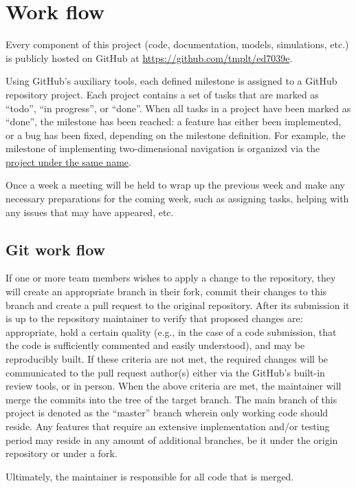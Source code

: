 \section{Work flow}
Every component of this project (code, documentation, models, simulations, etc.) is publicly hosted on GitHub at \href{https://github.com/tmplt/ed7039e}{https://github.com/tmplt/ed7039e}.

Using GitHub's auxiliary tools, each defined milestone is assigned to a GitHub repository project.
Each project contains a set of tasks that are marked as ``todo'', ``in progress'', or ``done''.
When all tasks in a project have been marked as ``done'', the milestone has been reached:
a feature has either been implemented, or a bug has been fixed, depending on the milestone definition.
For example, the milestone of implementing two-dimensional navigation is organized via the \href{https://github.com/tmplt/ed7039e/projects/1}{project under the same name}.

Once a week a meeting will be held to wrap up the previous week and make any necessary preparations for the coming week,
such as assigning tasks, helping with any issues that may have appeared, etc.

\subsection{Git work flow}
If one or more team members wishes to apply a change to the repository,
they will create an appropriate branch in their fork,
commit their changes to this branch and create a pull request to the original repository.
After its submission it is up to the repository maintainer to verify that proposed changes are:
appropriate,
hold a certain quality (e.g., in the case of a code submission, that the code is sufficiently commented and easily understood),
and may be reproducibly built. %
If these criteria are not met, the required changes will be communicated to the pull request author(s) either via the GitHub's built-in review tools, or in person.
When the above criteria are met, the maintainer will merge the commits into the tree of the target branch.
The main branch of this project is denoted as the ``master'' branch wherein only working code should reside.
Any features that require an extensive implementation and/or testing period may reside in any amount of additional branches,
be it under the origin repository or under a fork.

Ultimately, the maintainer is responsible for all code that is merged.
